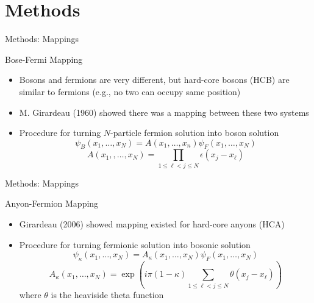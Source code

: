 \documentclass[12pt, usenames, dvipsnames]{beamer}
\begin{document}
\section{Methods}


\begin{frame}[t]{Methods: Mappings}

\begin{block}{Bose-Fermi Mapping}
\begin{itemize}
\item Bosons and fermions are very different, but hard-core bosons (HCB) are similar to fermions (e.g., no two can occupy same position)
\item M. Girardeau (1960) showed there was a mapping between these two systems
\item Procedure for turning $N$-particle fermion solution into boson solution
\[ \psi_{B}(x_1,\ldots, x_N) = A(x_1,\ldots, x_n)\psi_F(x_1,\ldots, x_N) \]
\[ A(x_1,,\ldots, x_N) = \prod_{1 \leq \ell < j \leq N}  \epsilon(x_j - x_\ell) \]
\end{itemize}
\end{block}


\end{frame}


\begin{frame}[t]{Methods: Mappings}

\begin{block}{Anyon-Fermion Mapping}
\begin{itemize}
\item Girardeau (2006) showed mapping existed for hard-core anyons (HCA)
\item Procedure for turning fermionic solution into bosonic solution
\[ \psi_{\kappa}(x_1,\ldots, x_N) = A_\kappa(x_1,\ldots, x_N)\psi_F(x_1,\ldots, x_N) \]
\[ A_{\kappa}(x_1,\ldots, x_N) = \exp(i \pi (1 - \kappa) \sum_{1 \leq \ell < j \leq N} \theta(x_j - x_\ell)) \]
where $\theta$ is the heaviside theta function
\end{itemize}
\end{block}


\end{frame}
\end{document}
